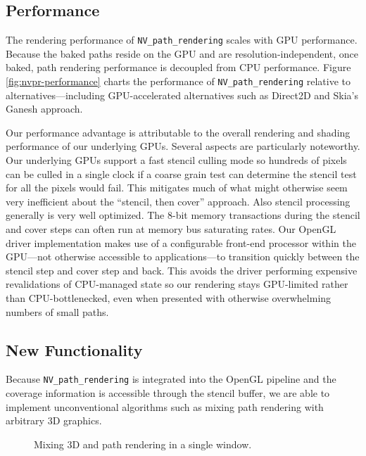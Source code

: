 \subsection{Performance}
\label{sec-performance}

The rendering performance of {\tt NV\_path\_rendering} scales with
GPU performance.  Because the baked paths reside on the GPU and are
resolution-independent, once baked, path rendering performance is
decoupled from CPU performance.
Figure \ref{fig:nvpr-performance}
charts the performance of {\tt NV\_path\_rendering} relative to
alternatives---including GPU-accelerated alternatives such as Direct2D and Skia's Ganesh approach.

Our performance advantage is attributable to the overall rendering
and shading performance of our underlying GPUs.  Several aspects are
particularly noteworthy.  Our underlying GPUs support a fast stencil
culling mode so hundreds of pixels can be culled in a single clock if a
coarse grain test can determine the stencil test for all the pixels would
fail.  This mitigates much of what might otherwise seem very inefficient
about the ``stencil, then cover'' approach.  Also stencil processing
generally is very well optimized.  The 8-bit memory transactions during
the stencil and cover steps can often run at memory bus saturating rates.
Our OpenGL driver implementation makes use of a configurable front-end
processor within the GPU---not otherwise accessible to applications---to
transition quickly between the stencil step and cover step and back.  This
avoids the driver performing expensive revalidations of CPU-managed
state so our rendering stays GPU-limited rather than CPU-bottlenecked,
even when presented with otherwise overwhelming numbers of small paths.

\subsection{New Functionality}
\label{sec:newfunc}

Because {\tt NV\_path\_rendering} is integrated into the OpenGL pipeline
and the coverage information is accessible through the stencil buffer,
we are able to implement unconventional algorithms such as mixing path
rendering with arbitrary 3D graphics.

\begin{figure}[bt]
  \caption{\label{fig:tiger3d} Mixing 3D and path rendering in a single
  window.}
\end{figure}


